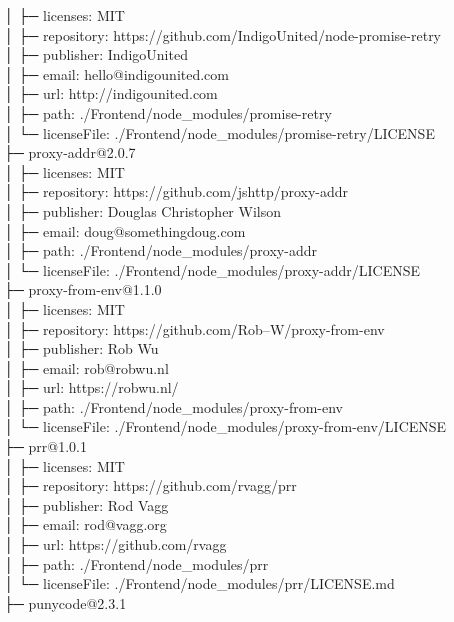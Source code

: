 \documentclass[
    paper=a4,
    twoside=false,
    parskip=half,
    listof=entryprefix,
    listof=totoc,
    index=totoc,
    bibliography=totoc,
    headsepline,
]{scrbook}
\begin{document}
    │  ├─ licenses: MIT\\
    │  ├─ repository: https://github.com/IndigoUnited/node-promise-retry\\
    │  ├─ publisher: IndigoUnited\\
    │  ├─ email: hello@indigounited.com\\
    │  ├─ url: http://indigounited.com\\
    │  ├─ path: ./Frontend/node\_modules/promise-retry\\
    │  └─ licenseFile: ./Frontend/node\_modules/promise-retry/LICENSE\\
    ├─ proxy-addr@2.0.7\\
    │  ├─ licenses: MIT\\
    │  ├─ repository: https://github.com/jshttp/proxy-addr\\
    │  ├─ publisher: Douglas Christopher Wilson\\
    │  ├─ email: doug@somethingdoug.com\\
    │  ├─ path: ./Frontend/node\_modules/proxy-addr\\
    │  └─ licenseFile: ./Frontend/node\_modules/proxy-addr/LICENSE\\
    ├─ proxy-from-env@1.1.0\\
    │  ├─ licenses: MIT\\
    │  ├─ repository: https://github.com/Rob--W/proxy-from-env\\
    │  ├─ publisher: Rob Wu\\
    │  ├─ email: rob@robwu.nl\\
    │  ├─ url: https://robwu.nl/\\
    │  ├─ path: ./Frontend/node\_modules/proxy-from-env\\
    │  └─ licenseFile: ./Frontend/node\_modules/proxy-from-env/LICENSE\\
    ├─ prr@1.0.1\\
    │  ├─ licenses: MIT\\
    │  ├─ repository: https://github.com/rvagg/prr\\
    │  ├─ publisher: Rod Vagg\\
    │  ├─ email: rod@vagg.org\\
    │  ├─ url: https://github.com/rvagg\\
    │  ├─ path: ./Frontend/node\_modules/prr\\
    │  └─ licenseFile: ./Frontend/node\_modules/prr/LICENSE.md\\
    ├─ punycode@2.3.1\\
\end{document}
